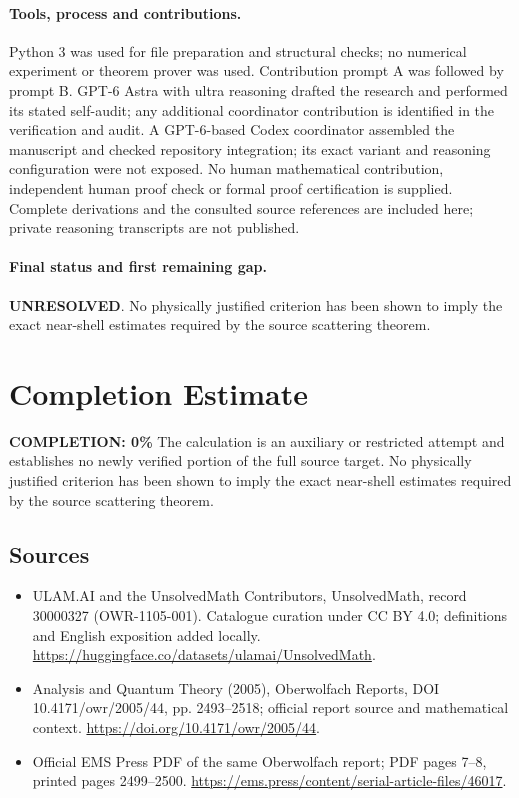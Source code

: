 \documentclass[11pt]{article}
\begin{document}
\paragraph{Tools, process and contributions.}
Python 3 was used for file preparation and structural checks; no numerical experiment or theorem prover was used. Contribution prompt A was followed by prompt B. GPT-6 Astra with ultra reasoning drafted the research and performed its stated self-audit; any additional coordinator contribution is identified in the verification and audit. A GPT-6-based Codex coordinator assembled the manuscript and checked repository integration; its exact variant and reasoning configuration were not exposed. No human mathematical contribution, independent human proof check or formal proof certification is supplied. Complete derivations and the consulted source references are included here; private reasoning transcripts are not published.

\paragraph{Final status and first remaining gap.}
\textbf{UNRESOLVED}. No physically justified criterion has been shown to imply the exact near-shell estimates required by the source scattering theorem.

\section{Completion Estimate}
\noindent\textbf{COMPLETION: 0\%}
The calculation is an auxiliary or restricted attempt and establishes no newly verified portion of the full source target. No physically justified criterion has been shown to imply the exact near-shell estimates required by the source scattering theorem.

\subsection{Sources}
\begin{itemize}
\item[\hypertarget{source:30000327:1}{S1}] ULAM.AI and the UnsolvedMath Contributors, UnsolvedMath, record 30000327 (OWR-1105-001). Catalogue curation under CC BY 4.0; definitions and English exposition added locally.
\url{https://huggingface.co/datasets/ulamai/UnsolvedMath}.
\item[\hypertarget{source:30000327:2}{S2}] Analysis and Quantum Theory (2005), Oberwolfach Reports, DOI 10.4171/owr/2005/44, pp. 2493--2518; official report source and mathematical context.
\url{https://doi.org/10.4171/owr/2005/44}.
\item[\hypertarget{source:30000327:3}{S3}] Official EMS Press PDF of the same Oberwolfach report; PDF pages 7--8, printed pages 2499--2500.
\url{https://ems.press/content/serial-article-files/46017}.
\end{itemize}
\label{end:30000327}
\end{document}
